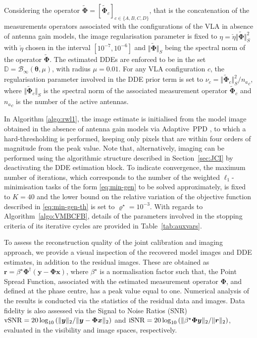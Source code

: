 \documentclass[fleqn,usenatbib]{mnras}
\newcommand{\xb}{\ensuremath{\boldsymbol{x}}}
\newcommand{\yb}{\ensuremath{\boldsymbol{y}}}
\newcommand{\rb}{\ensuremath{\boldsymbol{r}}}
\newcommand{\Phib}{\ensuremath{\boldsymbol{\Phi}}}
\newcommand{\eD}{\mathbb{D}}
\begin{document}
{{Considering the operator $\tilde{\Phib} =[ \tilde{\Phib}_c ]_{c\in\{A,B,C,D\}}$, that is the concatenation of the measurements operators associated with the configurations of the VLA in absence of antenna gain models, the image regularisation parameter is fixed to {{$\eta = \check{\eta} \Vert \tilde{\Phib} \Vert^2_S$}} with $\check{\eta}$ chosen in the interval $[10^{-7}, 10^{-6}]$ and $\Vert \tilde{\Phib} \Vert_S$ being the spectral norm of the operator $\tilde{\Phib}$. The estimated DDEs are enforced to be in the set $\eD=\mathcal{B}_\infty(\boldsymbol{\theta},\mu)$, with radius $\mu = 0.01$. For any VLA configuration $c$, the regularisation parameter involved in the DDE prior term is set to $\nu_c ={{\Vert \tilde{\Phib}_c \Vert^2_S}}/{n_a}_c$, where $\Vert \tilde{\Phib}_c \Vert_S$ is the spectral norm of the associated measurement operator $ \tilde{\Phib}_c$ and ${n_a}_c$ is the number of the active antennas. 


In Algorithm \ref{algo:rwl1}, the image estimate is initialised from the model image obtained in the absence of antenna gain models via {Adaptive~PPD} \citep{Dabbech2018}, to which a hard-thresholding is performed, keeping only pixels that are within four orders of magnitude from the peak value. 
Note that, alternatively, imaging can be performed using the algorithmic structure described in Section~\ref{sec:JCI} by deactivating the DDE estimation block. 
To indicate convergence, the maximum number of iterations, which corresponds to the number of the weighted $\ell_1$-minimisation tasks of the form \eqref{eq:min-gen} to be solved approximately, is fixed to $K=40$ and the lower bound on the relative variation of the objective function described in \eqref{eq:min-gen-th} is set to $\varrho^\star =10^{-3}$.
With regards to Algorithm~\ref{algo:VMBCFB}, details of the parameters involved in the stopping criteria of its iterative cycles are provided in Table~\ref{tab:auxvars}. }}

To assess the reconstruction quality of the joint calibration and imaging approach, we provide a visual inspection of the recovered model images and DDE estimates, in addition to the residual images. These are obtained as ${\rb} ={\beta}^{\star}{\Phib}^\dagger(\yb-{\Phib}{\xb})$, where ${\beta}^\star$ is a normalisation factor such that, the Point Spread Function, associated with the estimated measurement operator ${\Phib}$, and defined at the phase centre, has a peak value equal to one. Numerical analysis of the results is conducted via the statistics of the residual data and images. Data fidelity is also assessed via the Signal to Noise Ratios (SNR)
$\rm{vSNR} = 20\log_{10}\left({\Vert{\yb}\Vert_2}/{\Vert\yb-{\Phib}{\xb}\Vert_2}\right)$ and $\rm{iSNR} = 20\log_{10}\left({\Vert \beta^{\star}{\Phib}{\yb}\Vert_2}/\Vert{{\rb}\Vert_2}\right)$, evaluated in the visibility and image spaces, respectively.
\vspace{-0.1cm}
\end{document}

